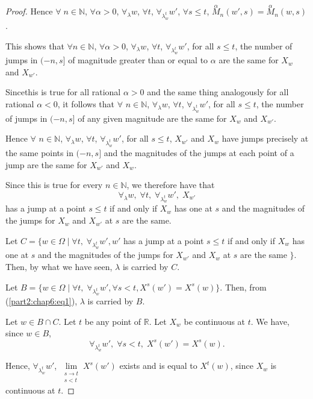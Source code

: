 \begin{proof}
Hence $\forall \; n \in \mathbb{N}$, $\forall \alpha > 0$,
$\forall_\lambda w$, $\forall t$, $\forall_{\lambda^t_w} w'$, $\forall
s \leq t$, $\overset{\alpha}{M}{}_n (w',s) =
\overset{\alpha}{M}_n(w,s)$. 

This shows that $\forall n \in \mathbb{N}$, $\forall \alpha >0$,
$\forall_\lambda w$, $\forall t$, $\forall_{\lambda^t_w} w'$, for
all $s \leq t$, the number of jumps in $(-n, s]$ of magnitude greater
  than or equal to $\alpha$ are the same for $X_w$ and $X_{w'}$. 

Since\pageoriginale this is true for all rational $\alpha >0$ and the
same thing analogously for all rational $\alpha <0$, it follows that
$\forall$ $n \in \mathbb{N}$, $\forall_\lambda w$, $\forall t$,
$\forall_{\lambda^t_w} w'$, for all $s \leq t$, the number of jumps in
$(-n,s]$ of any given magnitude are the same for $X_w$ and $X_{w'}$. 

Hence $\forall$ $n \in \mathbb{N}$, $\forall_\lambda w$, $\forall t$,
$\forall_{\lambda^t_w } w'$, for all $s \leq t$, $X_{w'}$ and $X_w$
have jumps precisely at the same points in $(-n, s]$ and the
magnitudes of the jumps at each point of a jump are the same for
$X_{w'}$  and $X_w$. 

Since this is true for every $n \in \mathbb{N}$, we therefore have
that 
$$
\forall_\lambda w, \; \forall t,  \; \forall_{\lambda^t_w} w', \;
X_{w'} 
$$
has a jump at a point $s \leq t$ if and only if $X_w$ has one at $s$
and the magnitudes of the jumps for $X_w$ and $X_{w'}$ at $s$ are the
same.

Let $C = \{w \in\Omega \mid \forall t, \; \forall_{\lambda^t_w} w' ,
w'$ has a jump at a point $s \leq t $ if and  only if $X_w$ has
  one at $s$ and  the magnitudes of the jumps for $X_{w'}$ and $X_w$
  at $s$ are the same  $\}$. Then, by what we have seen, $\lambda$ is
carried by $C$. 

Let $B = \{ w \in \Omega \mid \forall t, \; \forall_{\lambda^t_w} w',
\forall s <t, X^s(w') = X^s(w) \}$. Then, from (\ref{part2:chap6:eq1}), $\lambda$ is
carried by $B$. 

Let $w \in B \cap C$. Let $t$ be any point of $\mathbb{R}$. Let $X_w$
be continuous at $t$. We have, since $w \in B$,
$$
\forall_{\lambda^t_w} w', \; \forall s < t, \; X^s(w') = X^s(w). 
$$

Hence, $\forall_{\lambda^t_w} w'$, $\lim\limits_{\substack{s \to t
    \\ s<t}} X^s (w')$ exists and is equal to $X^t(w)$, since $X_w$ is
continuous at $t$.


\end{proof}
